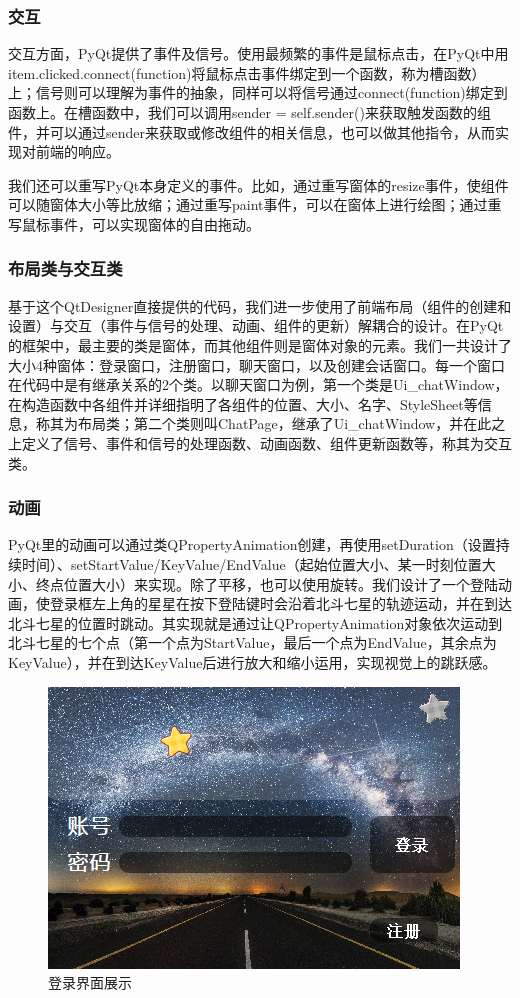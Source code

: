 \documentclass[12pt]{article} %
\begin{document}
\begin{sloppypar}
\subsubsection{交互}

交互方面，PyQt提供了事件及信号。使用最频繁的事件是鼠标点击，在PyQt中用item.clicked.connect(function)将鼠标点击事件绑定到一个函数，称为槽函数）上；信号则可以理解为事件的抽象，同样可以将信号通过connect(function)绑定到函数上。在槽函数中，我们可以调用sender = self.sender()来获取触发函数的组件，并可以通过sender来获取或修改组件的相关信息，也可以做其他指令，从而实现对前端的响应。

我们还可以重写PyQt本身定义的事件。比如，通过重写窗体的resize事件，使组件可以随窗体大小等比放缩；通过重写paint事件，可以在窗体上进行绘图；通过重写鼠标事件，可以实现窗体的自由拖动。

\subsubsection{布局类与交互类}

基于这个QtDesigner直接提供的代码，我们进一步使用了前端布局（组件的创建和设置）与交互（事件与信号的处理、动画、组件的更新）解耦合的设计。在PyQt的框架中，最主要的类是窗体，而其他组件则是窗体对象的元素。我们一共设计了大小4种窗体：登录窗口，注册窗口，聊天窗口，以及创建会话窗口。每一个窗口在代码中是有继承关系的2个类。以聊天窗口为例，第一个类是Ui\_chatWindow，在构造函数中各组件并详细指明了各组件的位置、大小、名字、StyleSheet等信息，称其为布局类；第二个类则叫ChatPage，继承了Ui\_chatWindow，并在此之上定义了信号、事件和信号的处理函数、动画函数、组件更新函数等，称其为交互类。

\subsubsection{动画}

PyQt里的动画可以通过类QPropertyAnimation创建，再使用setDuration（设置持续时间）、setStartValue/KeyValue/EndValue（起始位置大小、某一时刻位置大小、终点位置大小）来实现。除了平移，也可以使用旋转。我们设计了一个登陆动画，使登录框左上角的星星在按下登陆键时会沿着北斗七星的轨迹运动，并在到达北斗七星的位置时跳动。其实现就是通过让QPropertyAnimation对象依次运动到北斗七星的七个点（第一个点为StartValue，最后一个点为EndValue，其余点为KeyValue），并在到达KeyValue后进行放大和缩小运用，实现视觉上的跳跃感。

\begin{figure}[htbp]
	\centering
	\includegraphics[width=0.6\linewidth]{figure/reg.png}
	\caption{登录界面展示}
\end{figure}


\end{sloppypar}
\end{document}
